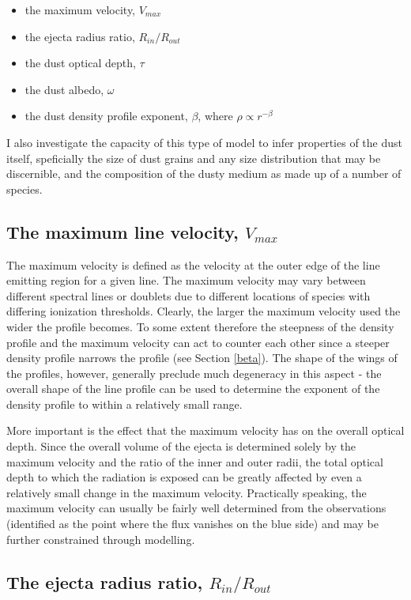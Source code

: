\begin{itemize}
\item the maximum velocity, $V_{max}$
\item the ejecta radius ratio, $R_{in}/R_{out}$
\item the dust optical depth,  $\tau$
\item the dust albedo, $\omega$ 
\item the dust density profile exponent, $\beta$, where $\rho \propto r^{-\beta}$
\end{itemize}

I also investigate the capacity of this type of model to infer properties of the dust itself, speficially the size of dust grains and any size distribution that may be discernible, and the composition of the dusty medium as made up of a number of species. 


\subsection{The maximum line velocity, $V_{max}$}

The maximum velocity is defined as the velocity at the outer edge of 
the line emitting region for a given line.  The 
maximum velocity may vary between different spectral lines or doublets due 
to different locations of  species with differing ionization 
thresholds.  Clearly, the larger the maximum velocity used the wider the 
profile becomes.  To some extent therefore the steepness of the density 
profile and the maximum velocity can act to counter each other since a steeper 
density profile narrows the profile (see Section \ref{beta}).  The shape 
of the wings of the profiles, however, generally preclude much degeneracy 
in this aspect - the overall shape of the line profile can be used to determine the 
exponent of the density profile to within a relatively small range.

More important is the effect that the maximum velocity has on the overall 
optical depth.  Since the overall volume of the ejecta is determined 
solely by the maximum velocity and the ratio of the inner and outer radii, 
the total optical depth to which the radiation is exposed can be greatly 
affected by even a relatively small change in the maximum velocity.  
Practically speaking, the maximum velocity can usually be fairly well determined 
from the observations (identified as the point where the flux vanishes 
on the blue side) and may be further constrained through modelling.

\subsection{The ejecta radius ratio, $R_{in}/R_{out}$}

